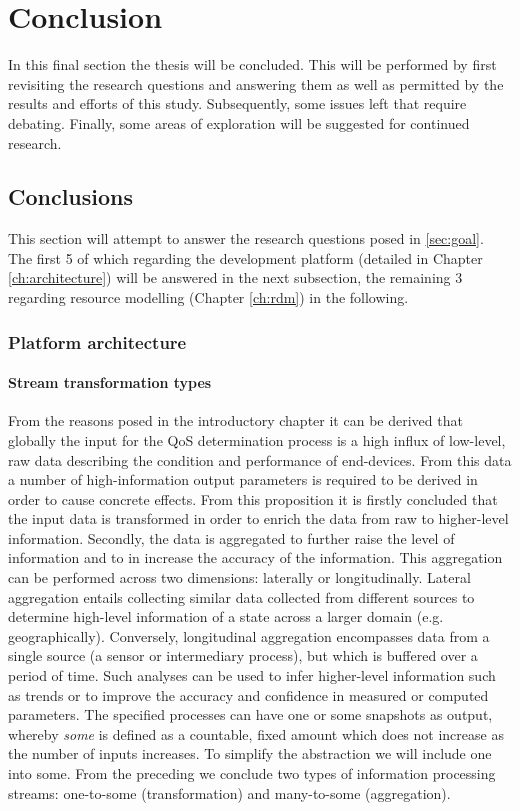 \chapter{Conclusion}
In this final section the thesis will be concluded. This will be performed by first revisiting the research questions and answering them as well as permitted by the results and efforts of this study. Subsequently, some issues left that require debating. Finally, some areas of exploration will be suggested for continued research.

\section{Conclusions}
\label{sec:conclusions}
This section will attempt to answer the research questions posed in \ref{sec:goal}. The first 5 of which regarding the development platform (detailed in Chapter \ref{ch:architecture}) will be answered in the next subsection, the remaining 3 regarding resource modelling (Chapter \ref{ch:rdm}) in the following.
\subsection{Platform architecture}
\subsubsection{Stream transformation types}
From the reasons posed in the introductory chapter it can be derived that globally the input for the QoS determination process is a high influx of low-level, raw data describing the condition and performance of end-devices. From this data a number of high-information output parameters is required to be derived in order to cause concrete effects. From this proposition it is firstly concluded that the input data is transformed in order to enrich the data from raw to higher-level information. Secondly, the data is aggregated to further raise the level of information and to in increase the accuracy of the information. This aggregation can be performed across two dimensions: laterally or longitudinally. Lateral aggregation entails collecting similar data collected from different sources to determine high-level information of a state across a larger domain (e.g. geographically). Conversely, longitudinal aggregation encompasses data from a single source (a sensor or intermediary process), but which is buffered over a period of time. Such analyses can be used to infer higher-level information such as trends or to improve the accuracy and confidence in measured or computed parameters. The specified processes can have one or some snapshots as output, whereby \emph{some} is defined as a countable, fixed amount which does not increase as the number of inputs increases. To simplify the abstraction we will include one into some. From the preceding we conclude two types of information processing streams: one-to-some (transformation) and many-to-some (aggregation).

